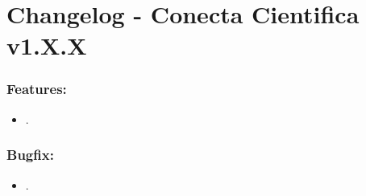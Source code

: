 \documentclass[
40pt,				%
openright,			%
oneside,			%
a4paper,			%
chapter=TITLE,		%
sumario=tradicional,
english,			%
]{abntex2}
\begin{document}
	
	
	\frenchspacing 
	
	\pretextual
	
	\textual
	\pagestyle{meuestilo}
	
	\chapter*{Changelog - Conecta Cientifica v1.X.X} 
	

	\subsection*{\textbf{Features:}} %
	\begin{itemize} \setlength\itemsep{0em}
		
		\item .
		

	\end{itemize}

	\subsection*{\textbf{Bugfix:}} %
	\begin{itemize} \setlength\itemsep{0em}

		\item .

	\end{itemize}

	
	
	\postextual
	
	
\end{document}
